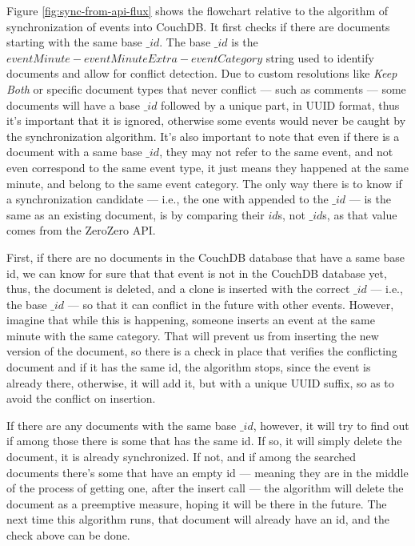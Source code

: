 Figure \ref{fig:sync-from-api-flux} shows the flowchart relative to the algorithm of synchronization of events into CouchDB. It first checks if there are documents starting with the same base $\_id$. The base $\_id$ is the $eventMinute-eventMinuteExtra-eventCategory$ string used to identify documents and allow for conflict detection. Due to custom resolutions like \textit{Keep Both} or specific document types that never conflict --- such as comments --- some documents will have a base $\_id$ followed by a unique part, in UUID format, thus it's important that it is ignored, otherwise some events would never be caught by the synchronization algorithm. It's also important to note that even if there is a document with a same base $\_id$, they may not refer to the same event, and not even correspond to the same event type, it just means they happened at the same minute, and belong to the same event category. The only way there is to know if a synchronization candidate --- i.e., the one with  appended to the $\_id$ ---  is the same as an existing document, is by comparing their $id$s, not $\_id$s, as that value comes from the ZeroZero API.

First, if there are no documents in the CouchDB database that have a same base id, we can know for sure that that event is not in the CouchDB database yet, thus, the  document is deleted, and a clone is inserted with the correct $\_id$ --- i.e., the base $\_id$ --- so that it can conflict in the future with other events. However, imagine that while this is happening, someone inserts an event at the same minute with the same category. That will prevent us from inserting the new version of the  document, so there is a check in place that verifies the conflicting document and if it has the same id, the algorithm stops, since the event is already there, otherwise, it will add it, but with a unique UUID suffix, so as to avoid the conflict on insertion.

If there are any documents with the same base $\_id$, however, it will try to find out if among those there is some that has the same id. If so, it will simply delete the  document, it is already synchronized. If not, and if among the searched documents there's some that have an empty id --- meaning they are in the middle of the process of getting one, after the insert call --- the algorithm will delete the  document as a preemptive measure, hoping it will be there in the future. The next time this algorithm runs, that document will already have an id, and the check above can be done.

